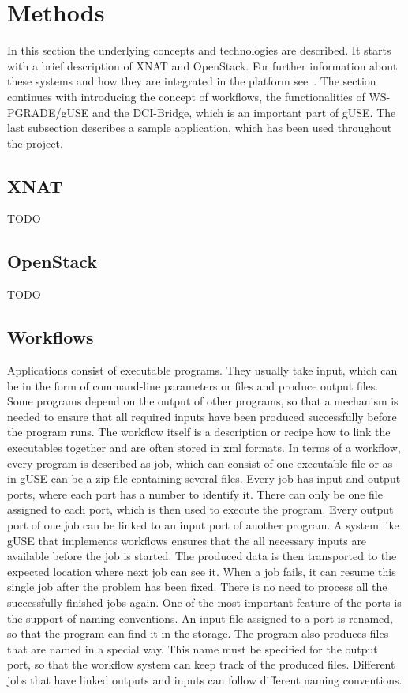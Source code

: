 \section{Methods}\label{methods}

In this section the underlying concepts and technologies are described. It starts with a brief description of XNAT and OpenStack. For further information about these systems and how they are integrated in the platform see~\cite{wu14}. The section continues with introducing the concept of workflows, the functionalities of WS-PGRADE/gUSE and the DCI-Bridge, which is an important part of gUSE. The last subsection describes a sample application, which has been used throughout the project.

\subsection{XNAT}\label{xnat}

TODO

\subsection{OpenStack}\label{openstack}

TODO

\subsection{Workflows}\label{workflows}

Applications consist of executable programs.
They usually take input, which can be in the form of command-line parameters or files and produce output files.
Some programs depend on the output of other programs, so that a mechanism is needed to ensure that all required inputs have been produced successfully before the program runs.
The workflow itself is a description or recipe how to link the executables together and are often stored in xml formats.
In terms of a workflow, every program is described as job, which can consist of one executable file or as in gUSE can be a zip file containing several files.
Every job has input and output ports, where each port has a number to identify it.
There can only be one file assigned to each port, which is then used to execute the program.
Every output port of one job can be linked to an input port of another program.
A system like gUSE that implements workflows ensures that the all necessary inputs are available before the job is started.
The produced data is then transported to the expected location where next job can see it.
When a job fails, it can resume this single job after the problem has been fixed.
There is no need to process all the successfully finished jobs again.
One of the most important feature of the ports is the support of naming conventions.
An input file assigned to a port is renamed, so that the program can find it in the storage.
The program also produces files that are named in a special way.
This name must be specified for the output port, so that the workflow system can keep track of the produced files.
Different jobs that have linked outputs and inputs can follow different naming conventions.

